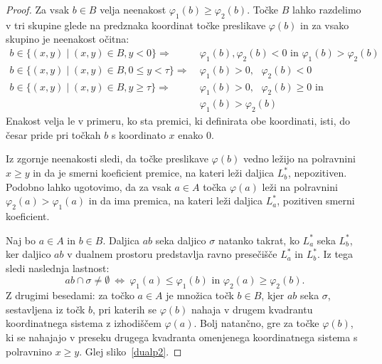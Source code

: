 \documentclass[a4paper, 12pt]{book}
\begin{document}
\begin{proof}
Za vsak $b\in B$ velja neenakost $\varphi_1(b) \geq \varphi_2(b)$. Točke $B$ lahko razdelimo v tri skupine glede na predznaka koordinat točke preslikave $\varphi(b)$ in za vsako skupino je neenakost očitna:
\begin{align*}
    b \in \{ (x,y) \mid (x,y) \in B, y < 0 \} \Rightarrow &~ \varphi_1(b),\varphi_2(b) < 0 \text{ in } \varphi_1(b) > \varphi_2(b) \\
b \in \{ (x,y) \mid (x,y) \in B, 0 \le y < \tau \} \Rightarrow &~ \varphi_1(b) > 0, \text{ } \varphi_2(b) < 0 \\
    b \in \{ (x,y) \mid (x,y) \in B, y \ge \tau \} \Rightarrow &~ \varphi_1(b) > 0, \text{ } \varphi_2(b) \ge 0 \text{ in }\\ 
    &~\varphi_1(b) > \varphi_2(b)
\end{align*}
Enakost velja le v primeru, ko sta premici, ki definirata obe koordinati, isti, do česar pride pri točkah $b$ s koordinato $x$ enako $0$. 

Iz zgornje neenakosti sledi, da točke preslikave $\varphi(b)$ vedno ležijo na polravnini $x \geq y$ in da je smerni koeficient premice, na kateri leži daljica $L^*_b$, nepozitiven. Podobno lahko ugotovimo, da za vsak $a \in A$ točka $\varphi(a)$ leži na polravnini $\varphi_2(a) > \varphi_1(a)$ in da ima premica, na kateri leži daljica $L^*_a$, pozitiven smerni koeficient.

Naj bo $a \in A$ in $b \in B$. Daljica $ab$ seka daljico $\sigma$ natanko takrat, ko $L^*_a$ seka $L^*_b$, ker daljico $ab$ v dualnem prostoru predstavlja ravno presečišče $L^*_a$ in $L^*_b$. Iz tega sledi naslednja lastnost:
	\[
		ab \cap \sigma \neq \emptyset ~\Longleftrightarrow ~ 
		\varphi_1(a)\le \varphi_1(b) \text{ in } \varphi_2(a)\ge \varphi_2(b).
	\]		
Z drugimi besedami: za točko $a \in A$ je množica točk $b \in B$, kjer $ab$ seka $\sigma$, sestavljena iz točk $b$, pri katerih se $\varphi(b)$ nahaja v drugem kvadrantu koordinatnega sistema z izhodiščem $\varphi(a)$. Bolj natančno, gre za točke $\varphi(b)$, ki se nahajajo v preseku drugega kvadranta omenjenega koordinatnega sistema s polravnino $x \geq y$. Glej sliko~\ref{dualp2}.


\end{proof}
\end{document}
